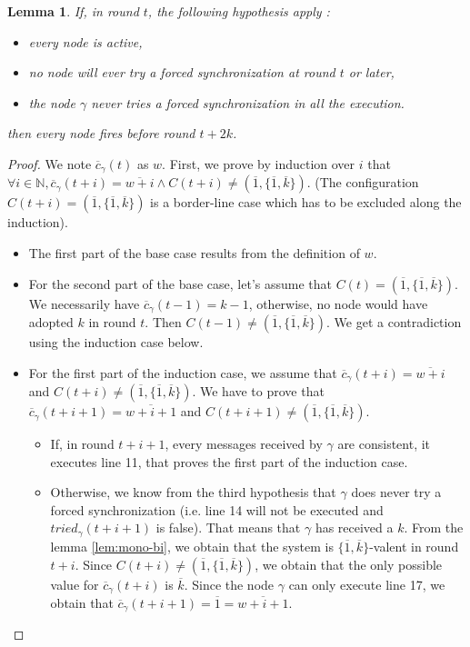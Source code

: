 \documentclass{article}
\newtheorem{lemma}{Lemma}[section]
\begin{document}
\begin{lemma}
	If, in round $t$, the following hypothesis apply :
	\begin{itemize}
		\item every node is active,
		\item no node will ever try a forced synchronization at round $t$ or later,
		\item the node $\gamma$ never tries a forced synchronization in all the execution.
	\end{itemize}
	then every node fires before round $t+2k$.
\end{lemma}
\begin{proof}
	We note $\overline{c}_\gamma(t)$ as $w$.
	First, we prove by induction over $i$ that $\forall i \in \mathds{N}, \overline{c}_\gamma(t+i) = \overline{w+i} \wedge C(t+i) \neq (\overline{1}, \{\overline{1}, \overline{k}\})$.
	(The configuration $C(t+i) = (\overline{1}, \{\overline{1}, \overline{k}\})$ is a border-line case which has to be excluded along the induction).
	\begin{itemize}
		\item The first part of the base case results from the definition of $w$.
		\item For the second part of the base case, let's assume that $C(t) = (\overline{1}, \{\overline{1}, \overline{k}\})$.
			We necessarily have $\overline{c}_\gamma(t-1) = k-1$, otherwise, no node would have adopted $k$ in round $t$.
			Then $C(t-1) \neq (\overline{1}, \{\overline{1}, \overline{k}\})$. We get a contradiction using the induction case below.
		\item For the first part of the induction case, we assume that $\overline{c}_\gamma(t+i) = \overline{w+i}$ and $C(t+i) \neq (\overline{1}, \{\overline{1}, \overline{k}\})$.
			We have to prove that $\overline{c}_\gamma(t+i+1) = \overline{w+i+1}$ and $C(t+i+1) \neq (\overline{1}, \{\overline{1}, \overline{k}\})$.

			\begin{itemize}
				\item If, in round $t+i+1$, every messages received by $\gamma$ are consistent, it executes line 11, that proves the first part of the induction case.
				\item Otherwise, we know from the third hypothesis that $\gamma$ does never try a forced synchronization (i.e. line 14 will not be executed and $tried_\gamma(t+i+1)$ is false).
					That means that $\gamma$ has received a $k$. From the lemma \ref{lem:mono-bi}, we obtain that the system is $\{\overline{1}, \overline{k}\}$-valent in round $t+i$.
					Since $C(t+i) \neq (\overline{1}, \{\overline{1}, \overline{k}\})$, we obtain that the only possible value for $\overline{c}_\gamma(t+i)$ is $\overline{k}$.
					Since the node $\gamma$ can only execute line 17, we obtain that $\overline{c}_\gamma(t+i+1) = \overline{1} = \overline{w+i+1}$.
			\end{itemize}


\end{itemize}
\end{proof}
\end{document}
